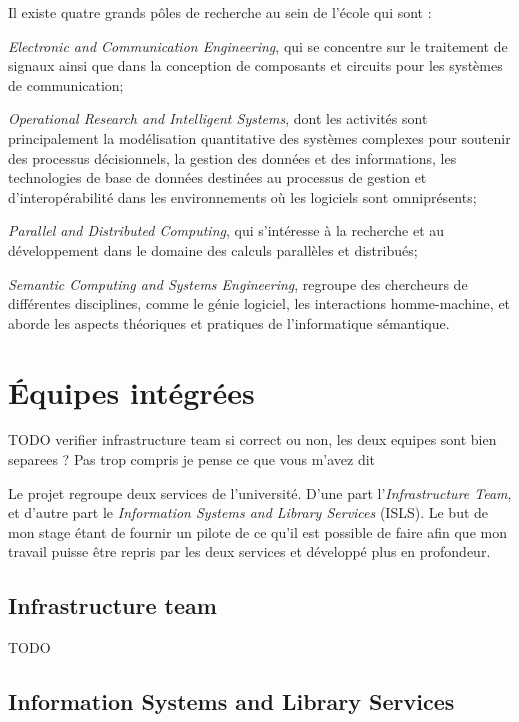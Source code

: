 Il existe quatre grands p\^oles de recherche au sein de l'\'ecole qui sont :

\textit{Electronic and Communication Engineering}, qui se concentre sur le traitement de signaux ainsi que dans la conception de composants et circuits pour les syst\`emes de communication;

\textit{Operational Research and Intelligent Systems}, dont les activit\'es sont principalement la mod\'elisation quantitative des syst\`emes complexes pour soutenir des processus d\'ecisionnels, la gestion des donn\'ees et des informations, les technologies de base de donn\'ees destin\'ees au processus de gestion et d'interop\'erabilit\'e dans les environnements o\`u les logiciels sont omnipr\'esents;

\textit{Parallel and Distributed Computing}, qui s'int\'eresse \`a la recherche et au d\'eveloppement dans le domaine des calculs parall\`eles et distribu\'es;

\textit{Semantic Computing and Systems Engineering}, regroupe des chercheurs de diff\'erentes disciplines, comme le g\'enie logiciel, les interactions homme-machine, et aborde les aspects th\'eoriques et pratiques de l'informatique s\'emantique.

\section{\'Equipes int\'egr\'ees}
TODO verifier infrastructure team si correct ou non, les deux equipes sont bien separees ? Pas trop compris je pense ce que vous m'avez dit

Le projet \YuukouII{} regroupe deux services de l'universit\'e. 
D'une part l'\textit{Infrastructure Team}, et d'autre part le \textit{Information Systems and Library Services} (ISLS).
Le but de mon stage \'etant de fournir un pilote de ce qu'il est possible de faire afin que mon travail puisse \^etre repris par les deux services et d\'evelopp\'e plus en profondeur.

\subsection{Infrastructure team}

TODO

\subsection{Information Systems and Library Services}


